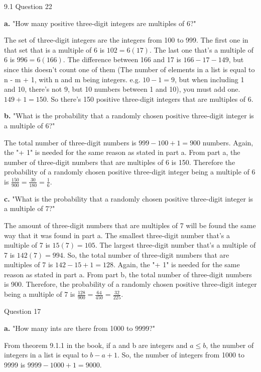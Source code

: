 \documentclass{article}
\begin{document}
\author{Michael Valentino-Manno}
9.1 Question 22
\item[]\textbf{a.} "How many positive three-digit integers are multiples of 6?"
\item The set of three-digit integers are the integers from 100 to 999. The first one in that set that is a multiple of 6 is $102 = 6(17)$. The last one that's a multiple of 6 is $996 = 6(166)$. The difference between 166 and 17 is $166 - 17 - 149$, but since this doesn't count one of them (The number of elements in a list is equal to n - m + 1, with n and m being integers. e.g. $10 - 1 = 9$, but when including 1 and 10, there's not 9, but 10 numbers between 1 and 10), you must add one. $149 + 1 = 150$. So there's 150 positive three-digit integers that are multiples of 6.
\item[]\textbf{b.} "What is the probability that a randomly chosen positive three-digit integer is a multiple of 6?"
\item The total number of three-digit numbers is  $999 - 100 + 1 = 900$ numbers. Again, the "+ 1" is needed for the same reason as stated in part a. From part a, the number of three-digit numbers that are multiples of 6 is 150. Therefore the probability of a randomly chosen positive three-digit integer being a multiple of 6 is $\frac{150}{900} = \frac{30}{180} = \frac{1}{6}$.
\item[]\textbf{c.} "What is the probability that a randomly chosen positive three-digit integer is a multiple of 7?"
\item The amount of three-digit numbers that are multiples of 7 will be found the same way that it was found in part a. The smallest three-digit number that's a multiple of 7 is $15(7) = 105$. The largest three-digit number that's a multiple of 7 is $142(7) = 994$. So, the total number of three-digit numbers that are multiples of 7 is $142 - 15 + 1 = 128$. Again, the "+ 1" is needed for the same reason as stated in part a. From part b, the total number of three-digit numbers is 900. Therefore, the probability of a randomly chosen positive three-digit integer being a multiple of 7 is $\frac{128}{900} = \frac{64}{450} = \frac{32}{225}$.


\clearpage
{} Question 17
\item[]\textbf{a.} "How many ints are there from 1000 to 9999?"
\item From theorem 9.1.1 in the book, if a and b are integers and $a \leq b$, the number of integers in a list is equal to $b - a + 1$. So, the number of integers from 1000 to 9999 is $9999 - 1000 + 1 = 9000$.
\end{document}
